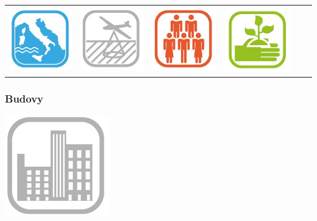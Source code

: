 \begin{frame}
\begin{center}
\begin{center}
\begin{tabular}{c c c c c c}
\includegraphics[scale=0.2]{obrazky/INSPIRE_Temata/SR.jpg} & \includegraphics[scale=0.2]{obrazky/INSPIRE_Temata/OI.jpg} & \includegraphics[scale=0.2]{obrazky/INSPIRE_Temata/PD.jpg} & \includegraphics[scale=0.2]{obrazky/INSPIRE_Temata/PS.jpg}\\
\end{tabular}
\end{center}
\end{center}
\end{frame}

\begin{frame}
\frametitle{Budovy}
\begin{center}
\includegraphics[scale=1]{obrazky/INSPIRE_Temata/BU.jpg}
\end{center}
\end{frame}


